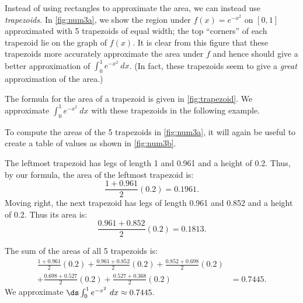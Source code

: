Instead of using rectangles to approximate the area, we can instead use \textit{trapezoids.} In \autoref{fig:num3a}, we show the region under $f(x) = e^{-x^2}$ on $[0,1]$ approximated with 5 trapezoids of equal width; the top ``corners'' of each trapezoid lie on the graph of $f(x)$. It is clear from this figure that these trapezoids more accurately approximate the area under $f$ and hence should give a better approximation of $\int_0^1 e^{-x^2}\ dx$. (In fact, these trapezoids seem to give a \textit{great} approximation of the area.)



The formula for the area of a trapezoid is given in \autoref{fig:trapezoid}. We approximate $\int_0^1 e^{-x^2}\ dx$ with these trapezoids in the following example.

{To compute the areas of the 5 trapezoids in \autoref{fig:num3a}, it will again be useful to create a table of values as shown in \autoref{fig:num3b}.


The leftmost trapezoid has legs of length 1 and 0.961 and a height of 0.2. Thus, by our formula, the area of the leftmost trapezoid is:
\[\frac{1+0.961}{2}(0.2) = 0.1961.\]
Moving right, the next trapezoid has legs of length 0.961 and 0.852 and a height of 0.2. Thus its area is:
\[\frac{0.961+0.852}2(0.2) = 0.1813.\]

The sum of the areas of all 5 trapezoids is:
\begin{align*}
\frac{1+0.961}{2}(0.2) + \frac{0.961+0.852}2(0.2)+\frac{0.852+0.698}2(0.2)& \\
+\frac{0.698+0.527}2(0.2)+\frac{0.527+0.368}2(0.2)&= 0.7445.
\end{align*}
We approximate $\ds \int_0^1 e^{-x^2}\ dx \approx 0.7445.$}


